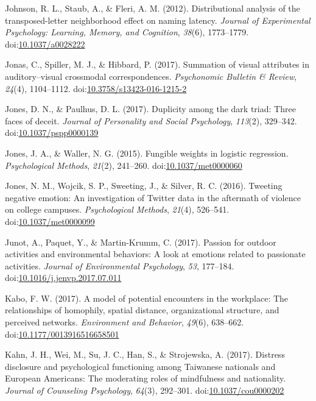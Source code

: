 \documentclass[english,man]{apa6}
\theoremstyle{definition}
\theoremstyle{definition}
\theoremstyle{definition}
\theoremstyle{remark}
\begin{document}
\hypertarget{ref-Johnson2012a}{}
Johnson, R. L., Staub, A., \& Fleri, A. M. (2012). Distributional
analysis of the transposed-letter neighborhood effect on naming latency.
\emph{Journal of Experimental Psychology: Learning, Memory, and
Cognition}, \emph{38}(6), 1773--1779.
doi:\href{https://doi.org/10.1037/a0028222}{10.1037/a0028222}

\hypertarget{ref-Jonas2017}{}
Jonas, C., Spiller, M. J., \& Hibbard, P. (2017). Summation of visual
attributes in auditory--visual crossmodal correspondences.
\emph{Psychonomic Bulletin \& Review}, \emph{24}(4), 1104--1112.
doi:\href{https://doi.org/10.3758/s13423-016-1215-2}{10.3758/s13423-016-1215-2}

\hypertarget{ref-Jones2017}{}
Jones, D. N., \& Paulhus, D. L. (2017). Duplicity among the dark triad:
Three faces of deceit. \emph{Journal of Personality and Social
Psychology}, \emph{113}(2), 329--342.
doi:\href{https://doi.org/10.1037/pspp0000139}{10.1037/pspp0000139}

\hypertarget{ref-Jones2015}{}
Jones, J. A., \& Waller, N. G. (2015). Fungible weights in logistic
regression. \emph{Psychological Methods}, \emph{21}(2), 241--260.
doi:\href{https://doi.org/10.1037/met0000060}{10.1037/met0000060}

\hypertarget{ref-Jones2016}{}
Jones, N. M., Wojcik, S. P., Sweeting, J., \& Silver, R. C. (2016).
Tweeting negative emotion: An investigation of Twitter data in the
aftermath of violence on college campuses. \emph{Psychological Methods},
\emph{21}(4), 526--541.
doi:\href{https://doi.org/10.1037/met0000099}{10.1037/met0000099}

\hypertarget{ref-Junot2017}{}
Junot, A., Paquet, Y., \& Martin-Krumm, C. (2017). Passion for outdoor
activities and environmental behaviors: A look at emotions related to
passionate activities. \emph{Journal of Environmental Psychology},
\emph{53}, 177--184.
doi:\href{https://doi.org/10.1016/j.jenvp.2017.07.011}{10.1016/j.jenvp.2017.07.011}

\hypertarget{ref-Kabo2017}{}
Kabo, F. W. (2017). A model of potential encounters in the workplace:
The relationships of homophily, spatial distance, organizational
structure, and perceived networks. \emph{Environment and Behavior},
\emph{49}(6), 638--662.
doi:\href{https://doi.org/10.1177/0013916516658501}{10.1177/0013916516658501}

\hypertarget{ref-Kahn2017}{}
Kahn, J. H., Wei, M., Su, J. C., Han, S., \& Strojewska, A. (2017).
Distress disclosure and psychological functioning among Taiwanese
nationals and European Americans: The moderating roles of mindfulness
and nationality. \emph{Journal of Counseling Psychology}, \emph{64}(3),
292--301.
doi:\href{https://doi.org/10.1037/cou0000202}{10.1037/cou0000202}
\end{document}
